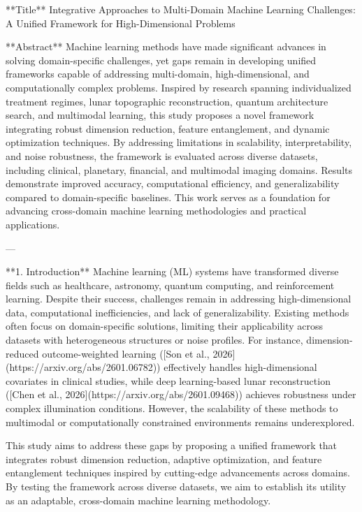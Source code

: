 **Title**  
Integrative Approaches to Multi-Domain Machine Learning Challenges: A Unified Framework for High-Dimensional Problems  

**Abstract**  
Machine learning methods have made significant advances in solving domain-specific challenges, yet gaps remain in developing unified frameworks capable of addressing multi-domain, high-dimensional, and computationally complex problems. Inspired by research spanning individualized treatment regimes, lunar topographic reconstruction, quantum architecture search, and multimodal learning, this study proposes a novel framework integrating robust dimension reduction, feature entanglement, and dynamic optimization techniques. By addressing limitations in scalability, interpretability, and noise robustness, the framework is evaluated across diverse datasets, including clinical, planetary, financial, and multimodal imaging domains. Results demonstrate improved accuracy, computational efficiency, and generalizability compared to domain-specific baselines. This work serves as a foundation for advancing cross-domain machine learning methodologies and practical applications.  

---

**1. Introduction**  
Machine learning (ML) systems have transformed diverse fields such as healthcare, astronomy, quantum computing, and reinforcement learning. Despite their success, challenges remain in addressing high-dimensional data, computational inefficiencies, and lack of generalizability. Existing methods often focus on domain-specific solutions, limiting their applicability across datasets with heterogeneous structures or noise profiles. For instance, dimension-reduced outcome-weighted learning ([Son et al., 2026](https://arxiv.org/abs/2601.06782)) effectively handles high-dimensional covariates in clinical studies, while deep learning-based lunar reconstruction ([Chen et al., 2026](https://arxiv.org/abs/2601.09468)) achieves robustness under complex illumination conditions. However, the scalability of these methods to multimodal or computationally constrained environments remains underexplored.  

This study aims to address these gaps by proposing a unified framework that integrates robust dimension reduction, adaptive optimization, and feature entanglement techniques inspired by cutting-edge advancements across domains. By testing the framework across diverse datasets, we aim to establish its utility as an adaptable, cross-domain machine learning methodology.  

